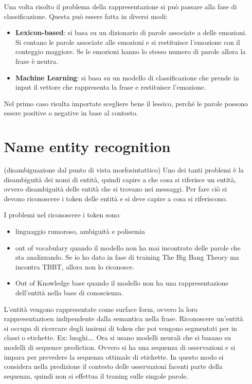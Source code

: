 Una volta risolto il problema della rappresentazione si può passare alla fase
di classificazione. Questa può essere fatta in diversi modi:
\begin{itemize}
      \item \textbf{Lexicon-based}: si basa su un dizionario di parole associate
            a delle emozioni. Si contano le parole associate alle emozioni e si
            restituisce l'emozione con il conteggio maggiore. Se le emozioni hanno
            lo stesso numero di parole allora la frase è neutra.
      \item \textbf{Machine Learning}: si basa su un modello di classificazione
            che prende in input il vettore che rappresenta la frase e restituisce
            l'emozione.
\end{itemize}
\begin{nota}
      Nel primo caso risulta importate scegliere bene il lessico, perché le parole
      possono essere positive o negative in base al contesto.
\end{nota}

\section{Name entity recognition}
(disambiguazione dal punto di vista morfosintattico)
Uno dei tanti problemi è la disambiguità dei nomi di entità, quindi capire a che cosa 
si riferisce un entità, ovvero disambiguità delle entità che si trovano nei messaggi.
Per fare ciò si devono riconoscere i token delle entità e si deve capire a cosa si 
riferiscono.

I problemi nel riconoscere i token sono:
\begin{itemize}
      \item linguaggio rumoroso, ambiguità e polisemia
      \item out of vocabulary quando il modello non ha mai incontrato delle parole 
      che sta analizzando. Se io ho dato in fase di training The Big Bang Theory
      ma incontra TBBT, allora non lo riconosce.
      \item Out of Knowledge base quando il modello non ha una rappresentazione dell'entità nella 
      base di conoscienza.
\end{itemize}


L'entità vengono rappresentate come surface form, ovvero la loro rappresentazioen 
indipendente dalla semantica nella frase. Riconoscere un'entità si occupa di 
ricercare degli insiemi di token che poi vengono segmentati per in classi o etichette.
Ex: luoghi\dots.
Ora si usano modelli neurali che si basano su modelli di sequence prediction.
Ovvero si ha una sequenza di osservazioni e si impara per prevedere la sequenza 
ottimale di etichette. In questo modo si considera nella predizione il contesto 
delle osservazioni facenti parte della sequenza, quindi non si effettua il traning 
sulle singole parole.

